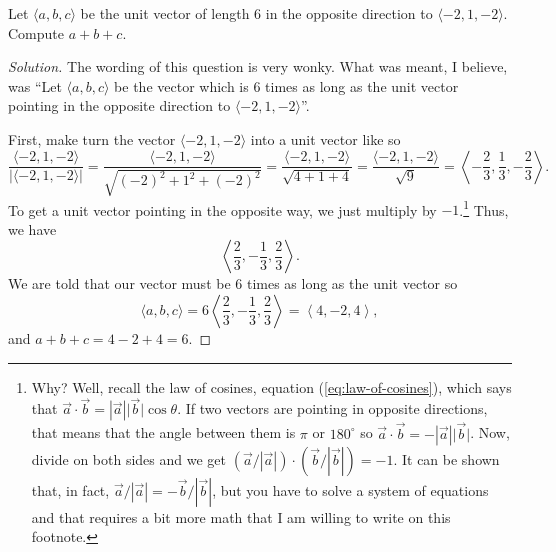\begin{problem}
Let $\langle a,b,c\rangle$ be the unit vector of length $6$ in the opposite
direction to $\langle -2,1,-2\rangle$. Compute $a+b+c$.
\end{problem}
\begin{proof}[Solution]
The wording of this question is very wonky. What was meant, I believe, was
``Let $\langle a,b,c\rangle$ be the vector which is $6$ times as long as
the unit vector pointing in the opposite direction to $\langle
-2,1,-2\rangle$''.

First, make turn the vector $\langle -2,1,-2\rangle$ into a unit vector
like so
\[
\frac{\langle -2,1,-2 \rangle}{\left|\langle -2,1,-2\rangle\right|}=
\frac{\langle -2,1,-2 \rangle}{\sqrt{(-2)^2+1^2+(-2)^2}}=
\frac{\langle -2,1,-2 \rangle}{\sqrt{4+1+4}}=
\frac{\langle -2,1,-2 \rangle}{\sqrt{9}}=
\left<-\frac{2}{3},\frac{1}{3},-\frac{2}{3}\right>.
\]
To get a unit vector pointing in the opposite way, we just multiply by
$-1$.\footnote{Why? Well, recall the law of cosines, equation
  (\ref{eq:law-of-cosines}), which says that
  $\vec a\cdot\vec b=\left|\vec a\right|\bigl|\vec b\bigr|\cos\theta$. If
  two vectors are pointing in opposite directions, that means that the
  angle between them is $\pi$ or $180^\circ$ so
  $\vec a\cdot\vec b=-\left|\vec a\right|\bigl|\vec b\bigr|$. Now, divide
  on both sides and we get $(\vec a/|\vec a|)\cdot(\vec b/|\vec b|)=-1$. It
  can be shown that, in fact, $\vec a/|\vec a|=-\vec b/|\vec b|$, but you
  have to solve a system of equations and that requires a bit more math
  that I am willing to write on this footnote.}
Thus, we have
\[
\left<\frac{2}{3},-\frac{1}{3},\frac{2}{3}\right>.
\]
We are told that our vector must be $6$ times as long as the unit vector so
\[
\langle a,b,c \rangle=
6\left<\frac{2}{3},-\frac{1}{3},\frac{2}{3}\right>=
\left<4,-2,4\right>,
\]
and $\boxed{a+b+c=4-2+4=6}$.
\end{proof}

